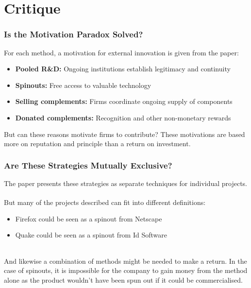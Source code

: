 \documentclass{beamer}
\begin{document}
\section{Critique}

\begin{frame}
\frametitle{Is the Motivation Paradox Solved?}
For each method, a motivation for external innovation is given from the paper:
\begin{itemize}
\item \textbf{Pooled R\&D:} Ongoing institutions establish legitimacy and continuity
\item \textbf{Spinouts:} Free access to valuable technology
\item \textbf{Selling complements:} Firms coordinate ongoing supply of components
\item \textbf{Donated complements:} Recognition and other non-monetary rewards
\end{itemize}

But can these reasons motivate firms to contribute? These motivations are based more on reputation and principle than a return on investment.
\end{frame}


\begin{frame}
\frametitle{Are These Strategies Mutually Exclusive?}
The paper presents these strategies as separate techniques for individual projects.\\~\\

But many of the projects described can fit into different definitions:
\begin{itemize}
\item Firefox could be seen as a spinout from Netscape
\item Quake could be seen as a spinout from Id Software
\end{itemize}

~\\And likewise a combination of methods might be needed to make a return. In the case of spinouts, it is impossible for the company to gain money from the method alone as the product wouldn't have been spun out if it could be commercialised.
\end{frame}

\end{document}
